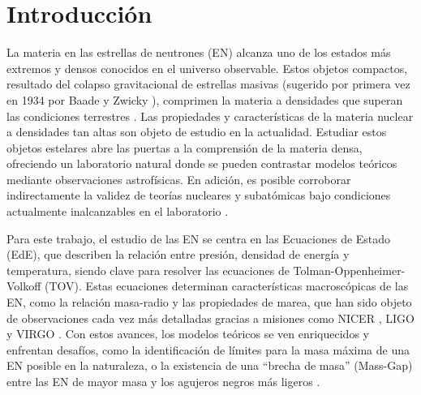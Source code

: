 \chapter{Introducción}
\thispagestyle{fancy}


La materia en las estrellas de neutrones (EN) alcanza uno de los estados más extremos y densos conocidos en el universo observable. Estos objetos compactos, resultado del colapso gravitacional de estrellas masivas (sugerido por primera vez en 1934 por Baade y Zwicky \cite{baadeRemarksSuperNovaeCosmic1934}), comprimen la materia a densidades que superan las condiciones terrestres \cite{glendenningCompactStarsNuclear2000}. Las propiedades y características de la materia nuclear a densidades tan altas son objeto de estudio en la actualidad. Estudiar estos objetos estelares abre las puertas a la comprensión de la materia densa, ofreciendo un laboratorio natural donde se pueden contrastar modelos teóricos mediante observaciones astrofísicas. En adición, es posible corroborar indirectamente la validez de teorías nucleares y subatómicas bajo condiciones actualmente inalcanzables en el laboratorio \cite{raaijmakersConstraintsDenseMatter2021}.

Para este trabajo, el estudio de las EN se centra en las Ecuaciones de Estado (EdE), que describen la relación entre presión, densidad de energía y temperatura, siendo clave para resolver las ecuaciones de Tolman-Oppenheimer-Volkoff (TOV). Estas ecuaciones determinan características macroscópicas de las EN, como la relación masa-radio y las propiedades de marea, que han sido objeto de observaciones cada vez más detalladas gracias a misiones como NICER \cite{romaniPSRJ09520607Fastest2022, fonsecaRefinedMassGeometric2021, antoniadisMassivePulsarCompact2013}, LIGO y VIRGO \cite{collaborationGWTC21DeepExtended2022,theligoscientificcollaborationGW170817ObservationGravitational2017, theligoscientificcollaborationGW190814GravitationalWaves2020}. Con estos avances, los modelos teóricos se ven enriquecidos y enfrentan desafíos, como la identificación de límites para la masa máxima de una EN posible en la naturaleza, o la existencia de una ``brecha de masa'' (Mass-Gap) entre las EN de mayor masa y los agujeros negros más ligeros \cite{shaoNeutronStarBlack2022a}.

